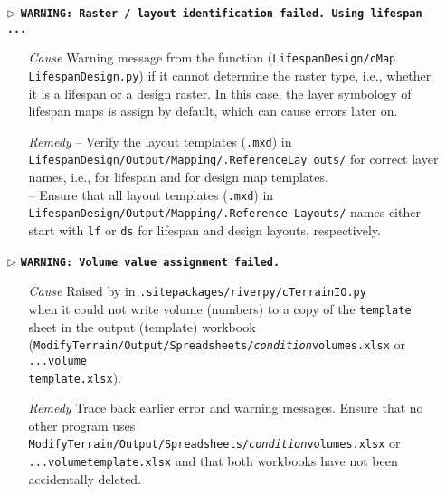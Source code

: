 \begin{itemize}
	\item[$\triangleright$]\textbf{\texttt{WARNING: Raster / layout identification failed. Using lifespan ...}}
	\begin{itemize}
		\item[\textit{Cause}\hspace{0.27cm}] Warning message from the  function (\texttt{LifespanDesign/cMap LifespanDesign.py}) if it cannot determine the raster type, i.e., whether it is a lifespan or a design raster. In this case, the layer symbology of lifespan maps is assign by default, which can cause errors later on.
		\item[\textit{Remedy}] -- Verify the layout templates (\texttt{.mxd}) in \texttt{LifespanDesign/Output/Mapping/.ReferenceLay outs/} for correct layer names, i.e.,  for lifespan and  for design map templates.\\
													 -- Ensure that all layout templates (\texttt{.mxd}) in \texttt{LifespanDesign/Output/Mapping/.Reference Layouts/} names either start with \texttt{lf} or \texttt{ds} for lifespan and design layouts, respectively.\\
	\end{itemize}
	
	\item[$\triangleright$]\textbf{\texttt{WARNING: Volume value assignment failed.}}
	\begin{itemize}
		\item[\textit{Cause}\hspace{0.27cm}] Raised by  in \texttt{.site{\myUnderscore}packages/riverpy/cTerrainIO.py}\\when it could not write volume (numbers) to a copy of the \texttt{template} sheet in the output (template) workbook (\texttt{ModifyTerrain/Output/Spreadsheets/\textit{condition}{\myUnderscore}volumes.xlsx} or \texttt{...volume{\myUnderscore}}\\ \texttt{template.xlsx}).
		\item[\textit{Remedy}] Trace back earlier error and warning messages. Ensure that no other program uses \texttt{ModifyTerrain/Output/Spreadsheets/\textit{condition}{\myUnderscore}volumes.xlsx} or \texttt{...volume{\myUnderscore}template.xlsx} and that both workbooks have not been accidentally deleted.\\
	\end{itemize}	
\end{itemize}
